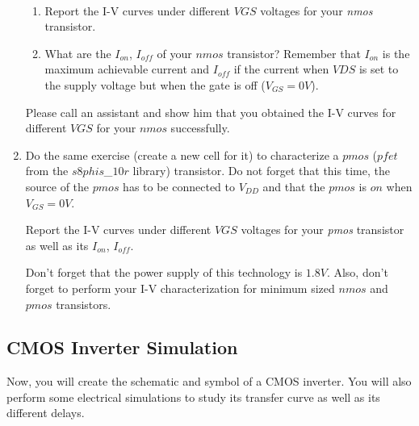 \begin{enumerate}
	
	\begin{exercise}\ \label{ex1}
		\vspace{-5mm}
		\begin{enumerate}
			\item Report the I-V curves under different $VGS$ voltages for your \textit {nmos} transistor.
			\item What are the $I_{on}$, $I_{off}$ of your $nmos$ transistor? Remember that $I_{on}$ is the maximum achievable current and $I_{off}$ if the current when $VDS$ is set to the supply voltage but when the gate is off ($V_{GS}=0V$).
		\end{enumerate}
	\vspace{-5mm}
	\end{exercise}	

\begin{checkpoint}\label{check1}
	Please call an assistant and show him that you obtained the I-V curves for different $VGS$ for your $nmos$ successfully.
\end{checkpoint}	
	
	\item Do the same exercise (create a new cell for it) to characterize a $pmos$ (\textit{$pfet$} from the \textit{$s8phis$\_$10r$} library) transistor. Do not forget that this time, the source of the $pmos$ has to be connected to $V_{DD}$ and that the $pmos$ is $on$ when $V_{GS}=0V$.
	
	\begin{exercise}\label{ex2}
Report the I-V curves under different $VGS$ voltages for your \textit {pmos} transistor as well as its $I_{on}$, $I_{off}$.
	\end{exercise}	
	
	
	\begin{remark}
		Don't forget that the power supply of this technology is $1.8V$. Also, don't forget to perform your I-V characterization for minimum sized $nmos$ and $pmos$ transistors.
	\end{remark}
\end{enumerate}	


\subsection{CMOS Inverter Simulation}
Now, you will create the schematic and symbol of a CMOS inverter. You will also perform some electrical simulations to study its transfer curve as well as its different delays.


